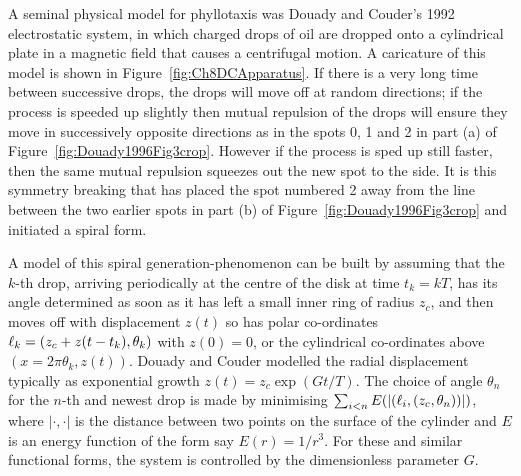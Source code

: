 A seminal physical model for phyllotaxis was Douady and Couder's 1992 electrostatic system, in which charged drops of oil are dropped onto a cylindrical plate in a magnetic field that causes a centrifugal motion. A caricature of this model is shown in Figure~\ref{fig:Ch8DCApparatus}.
If there is a very long time between successive drops, the drops will move off at random directions; if the process is speeded up slightly then mutual repulsion of the drops 
will ensure they move in successively opposite directions  as in the spots 0, 1 and 2 in part (a) of Figure~\ref{fig:Douady1996Fig3crop}. However if the process is sped up still faster, then the same mutual repulsion squeezes out the new spot to the side.  It is this symmetry breaking that has placed the spot numbered 2 away from the line between the two earlier spots in part (b) of Figure~\ref{fig:Douady1996Fig3crop} and initiated a spiral form.



A model of this spiral generation-phenomenon  can be built by assuming that the $k$\nobreakdash-th drop, arriving periodically at the centre of the disk at time $t_k= k T$, has its angle determined as soon as it has left a small inner ring of radius $z_c$, and then moves off with displacement $z(t)$ so has polar co-ordinates $\ell_{{k}}=(z_c+z(t-t_k), \theta_k)$ with  $z(0)=0$, or the cylindrical co-ordinates above $(x=2\pi \theta_k,z(t))$. Douady and Couder modelled the radial displacement typically as exponential growth $z(t)=z_c\exp (Gt/T)$. 
 The choice of angle $\theta_n$ for the $n$-th and newest drop is made by minimising $\sum_{i<n} E(|(\ell_{{i}}, (z_c,\theta_n) )|)$, where $|\cdot,\cdot|$ is the distance  between two points on the surface of the cylinder and $E$ is an energy function of the form say $E(r)=1/r^3$.  For these and similar functional forms, the system is controlled by the dimensionless parameter $G$. 
  
